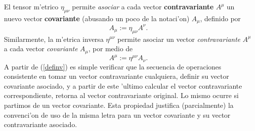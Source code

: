 El tensor m'etrico $\eta_{\mu\nu}$ permite \textit{asociar} a cada vector
\textbf{contravariante} $A^\mu$ un nuevo vector \textbf{covariante}  (abusando
un poco de la notaci'on) $A_\mu$, definido por
\begin{equation}
A_\mu:=\eta_{\mu\nu}A^\nu.
\end{equation}
Similarmente, la m'etrica inversa $\eta^{\mu\nu}$ permite asociar un vector
\textit{contravariante} $A^\mu$ a cada vector \textit{covariante} $A_\mu$, por
medio de
\begin{equation}
A^\mu:=\eta^{\mu\nu}A_\nu.
\end{equation}
A partir de (\ref{definv}) es simple verificar que la secuencia de operaciones consistente en tomar un vector contravariante cualquiera, definir su vector covariante asociado, y a partir de este 'ultimo calcular el vector contravariante correspondiente, retorna al vector contravariante original. Lo mismo ocurre si partimos de un vector covariante. Esta propiedad justifica (parcialmente) la convenci'on de uso de la misma letra para un vector covariante y su vector contravariante asociado.

